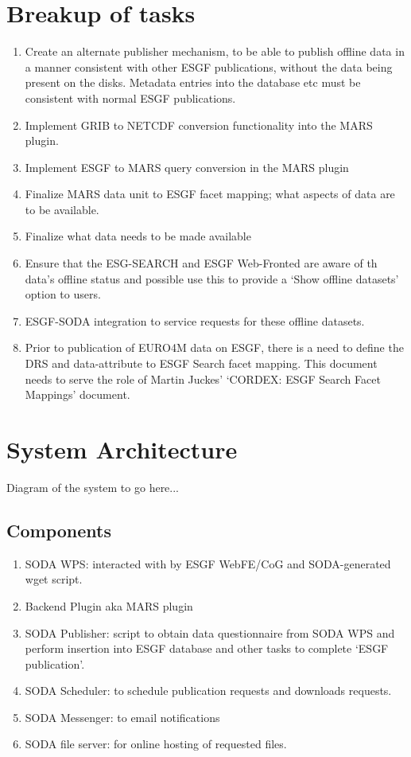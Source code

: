 \documentclass[oneside,12pt]{memoir}
\begin{document}
\section{Breakup of tasks}
\begin{enumerate}
\item Create an alternate publisher mechanism, to be able to publish offline data in a manner consistent with other ESGF publications, without the data being present on the disks. Metadata entries into the database etc must be consistent with normal ESGF publications.
\item Implement GRIB to NETCDF conversion functionality into the MARS plugin.
\item Implement ESGF to MARS query conversion in the MARS plugin
\item Finalize MARS data unit to ESGF facet mapping; what aspects of data are to be available.
\item Finalize what data needs to be made available
\item Ensure that the ESG-SEARCH and ESGF Web-Fronted are aware of th data's offline status and possible use this to provide a `Show offline datasets' option to users.
\item ESGF-SODA integration to service requests for these offline datasets.
\item Prior to publication of EURO4M data on ESGF, there is a need to define the DRS and data-attribute to ESGF Search facet mapping. This document needs to serve the
role of Martin Juckes' `CORDEX: ESGF Search Facet Mappings' document.
\end{enumerate}

\section{System Architecture}
Diagram of the system to go here...\\
\subsection{Components}
\begin{enumerate}
\item SODA WPS: interacted with by ESGF WebFE/CoG and SODA-generated wget script.
\item Backend Plugin aka MARS plugin
\item SODA Publisher: script to obtain data questionnaire from SODA WPS and perform insertion into ESGF database and other tasks to complete `ESGF publication'.
\item SODA Scheduler: to schedule publication requests and downloads requests.
\item SODA Messenger: to email notifications
\item SODA file server: for online hosting of requested files.
\end{enumerate}
\end{document}
